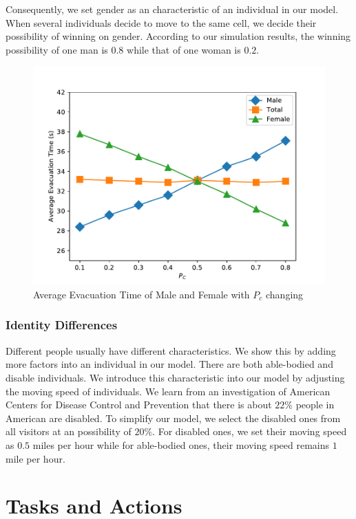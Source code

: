 \documentclass{mcmthesis}
\begin{document}
Consequently, we set gender as an characteristic of an individual in our model. When several individuals decide to move to the same cell, we decide their possibility of winning on gender.
According to our simulation results, the winning possibility of one man is $0.8$ while that of one woman is $ 0.2$. 
\begin{figure}[H]
\includegraphics[scale=0.5]{gender}
\centering\captionsetup{font=small, labelfont=bf}\caption{Average Evacuation Time of Male and Female with $P_c$ changing}\label{gender}
\end{figure}
\subsubsection{Identity Differences}
Different people usually have different characteristics. We show this by adding more factors into an individual in our model. There are both able-bodied and disable individuals. We introduce this characteristic into our model by adjusting the moving speed of individuals. 
We learn from an investigation of  American Centers for Disease Control and Prevention \cite{disabled}that there is about $22\%$ people in American are disabled. To simplify our model, we select the disabled ones from all visitors at an possibility of $20\%$. For disabled ones, we set their moving speed as $0.5$ miles per hour while for able-bodied ones, their moving speed remains $1$ mile per hour.




\section{Tasks and Actions}
\end{document}

